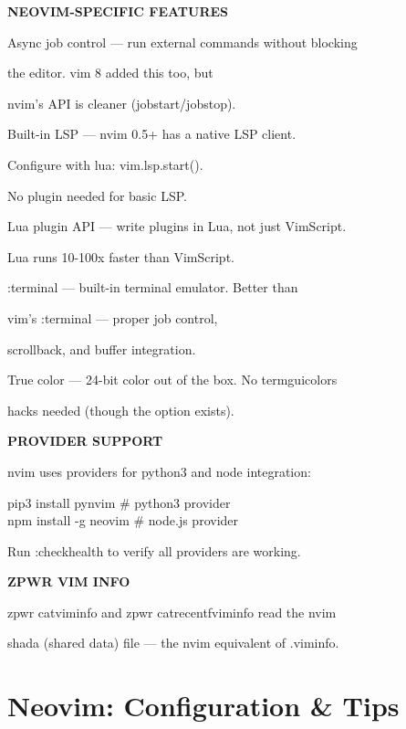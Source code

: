\documentclass[11pt,a4paper,twoside]{book}
\begin{document}
\vspace{12pt}
{\bfseries\color{neonyellow} NEOVIM-SPECIFIC FEATURES}\vspace{4pt}

Async job control  — run external commands without blocking

the editor. vim 8 added this too, but

nvim's API is cleaner (jobstart/jobstop).

Built-in LSP       — nvim 0.5+ has a native LSP client.

Configure with lua: vim.lsp.start().

No plugin needed for basic LSP.

Lua plugin API     — write plugins in Lua, not just VimScript.

Lua runs 10-100x faster than VimScript.

:terminal          — built-in terminal emulator. Better than

vim's :terminal — proper job control,

scrollback, and buffer integration.

True color         — 24-bit color out of the box. No termguicolors

hacks needed (though the option exists).


\vspace{12pt}
{\bfseries\color{neonyellow} PROVIDER SUPPORT}\vspace{4pt}

nvim uses providers for python3 and node integration:

\begin{codebox}
pip3 install pynvim          \# python3 provider\\
npm install -g neovim        \# node.js provider\\
\end{codebox}

Run :checkhealth to verify all providers are working.


\vspace{12pt}
{\bfseries\color{neonyellow} ZPWR VIM INFO}\vspace{4pt}

zpwr catviminfo and zpwr catrecentfviminfo read the nvim

shada (shared data) file — the nvim equivalent of .viminfo.


\vspace{16pt}

\section{Neovim: Configuration \& Tips}
\end{document}
